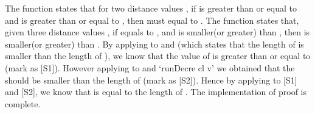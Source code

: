 The  function states that for two distance values , if  is greater than or equal to  and  is greater than or equal to , then  must equal to . The  function states that, given three distance values , if  equals to , and  is smaller(or greater) than , then  is smaller(or greater) than . By applying  to  and  (which states that the length of  is smaller than the length of ), we know that the value of  is greater than or equal to (mark as [S1]). However applying  to  and {`runDecre cl v'} we obtained that the  should be smaller than the length of (mark as [S2]). Hence by applying  to [S1] and [S2], we know that  is equal to the length of . The implementation of  proof is complete. 
\\
